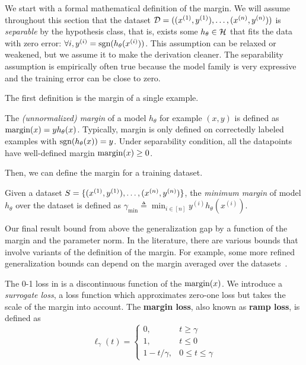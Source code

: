 We start with a formal mathematical definition of the margin. We will assume throughout this section that the dataset $\cD = ((x\sp{1}, y\sp{1}), \dots, (x\sp{n}, y\sp{n}))$ is \textit{separable} by the hypothesis class, that is,  exists some $h_\theta\in\cH$ that fits the data with zero error: $\forall i, y^{(i)} = \sgn(h_\theta(x^{(i)}))$. This assumption can be relaxed or weakened, but we assume it to  make the derivation cleaner. The separability assumption is empirically often true because the model family is very expressive and the training error can be close to zero. 

The first definition is the margin of a single example. 
\begin{definition}
The \textit{(unnormalized) margin} of a model $h_\theta$ for example $(x, y)$ is defined as $\margin(x) = yh_\theta(x)$. Typically, margin is only defined on correctedly labeled examples with $\sgn(h_\theta(x)) = y$. Under separability condition, all the datapoints have well-defined margin $\margin(x)\geq 0$. 
\end{definition}

Then, we can define the margin for a training dataset. 
\begin{definition} Given a dataset $S = \{(x\sp{1}, y\sp{1}), \dots, (x\sp{n}, y\sp{n})\}$, the \textit{minimum margin} of model $h_\theta$ over the dataset is defined as $\gamma_{\min} \triangleq \min_{i\in [n]} y^{(i)}h_\theta(x^{(i)})$.
\end{definition}

Our final result bound from above the generalization gap by a function of the margin and the parameter norm. In the literature, there are various bounds that involve variants of the definition of the margin. %
For example, some more refined generalization bounds can depend on the margin averaged over the datasets~\citep{srebro2010optimistic,wei2020improved}.

The 0-1 loss in   is a discontinuous function of the $\margin(x)$. We introduce a \textit{surrogate loss}, a loss function which approximates zero-one loss but takes the scale of the margin into account. The \textbf{margin loss}, also known as \textbf{ramp loss}, is defined as 
\begin{equation}
    \ell_\gamma(t) = \begin{cases} 
      0, & t\geq \gamma \\
      1, & t\leq 0 \\
      1-t/\gamma, & 0\leq t\leq \gamma
   \end{cases} \label{lec6:eqn:ramp_loss}
\end{equation}

